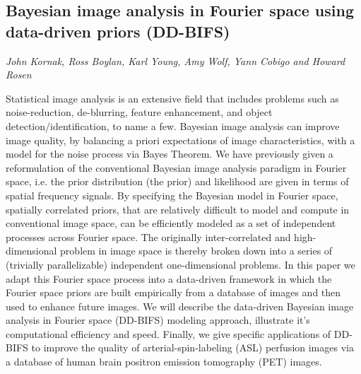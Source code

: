 \documentclass[../booklet.tex]{subfiles}
\begin{document}
\subsection[Bayesian image analysis in Fourier space using data-driven priors (DD-BIFS). {\it John Kornak, Ross Boylan, Karl Young, Amy Wolf, Yann Cobigo and Howard Rosen}]{Bayesian image analysis in Fourier space using data-driven priors (DD-BIFS)}
     

\begin{center}
  {\it John Kornak, Ross Boylan, Karl Young, Amy Wolf, Yann Cobigo and Howard Rosen}
\end{center}



Statistical image analysis is an extensive field that includes problems such as noise-reduction, de-blurring, feature enhancement, and object detection/identification, to name a few. Bayesian image analysis can improve image quality, by balancing a priori expectations of image characteristics, with a model for the noise process via Bayes Theorem. We have previously given a reformulation of the conventional Bayesian image analysis paradigm in Fourier space, i.e. the prior distribution (the prior) and likelihood are given in terms of spatial frequency signals. By specifying the Bayesian model in Fourier space, spatially correlated priors, that are relatively difficult to model and compute in conventional image space, can be efficiently modeled as a set of independent processes across Fourier space. The originally inter-correlated and high-dimensional problem in image space is thereby broken down into a series of (trivially parallelizable) independent one-dimensional problems. In this paper we adapt this Fourier space process into a data-driven framework in which the Fourier space priors are built empirically from a database of images and then used to enhance future images. We will describe the data-driven Bayesian image analysis in Fourier space (DD-BIFS) modeling approach, illustrate it's computational efficiency and speed. Finally, we give specific applications of DD-BIFS to improve the quality of arterial-spin-labeling (ASL) perfusion images via a database of human brain positron emission tomography (PET) images.

\end{document}
